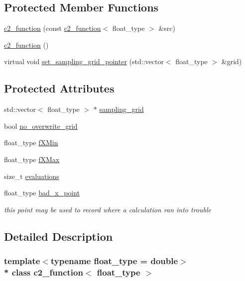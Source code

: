\subsection*{Protected Member Functions}
\begin{DoxyCompactItemize}
\item 
\hyperlink{classc2__function_a0dcc0aa8129ea37e46a72bcafd5d1dc3}{c2\+\_\+function} (const \hyperlink{classc2__function}{c2\+\_\+function}$<$ float\+\_\+type $>$ \&src)
\item 
\hyperlink{classc2__function_acc63ccad3b4a2151c641695003aa977f}{c2\+\_\+function} ()
\item 
virtual void \hyperlink{classc2__function_af06d3b95c044d5ece8343badec919d17}{set\+\_\+sampling\+\_\+grid\+\_\+pointer} (std\+::vector$<$ float\+\_\+type $>$ \&grid)
\end{DoxyCompactItemize}
\subsection*{Protected Attributes}
\begin{DoxyCompactItemize}
\item 
std\+::vector$<$ float\+\_\+type $>$ $\ast$ \hyperlink{classc2__function_ad9714faf2c3d053a77fd733b52834754}{sampling\+\_\+grid}
\item 
bool \hyperlink{classc2__function_a12085ddfc5716c442bb59c5672e140dd}{no\+\_\+overwrite\+\_\+grid}
\item 
float\+\_\+type \hyperlink{classc2__function_a72d60216e8a9c61039d4895c6a15b0ce}{f\+X\+Min}
\item 
float\+\_\+type \hyperlink{classc2__function_a8d000a2d3ca13a119f4bcf4e31a9bca6}{f\+X\+Max}
\item 
size\+\_\+t \hyperlink{classc2__function_a0737663eb36818cd357852479e6b96f2}{evaluations}
\item 
float\+\_\+type \hyperlink{classc2__function_a19b31dd52b778a2fe5f156def38e41d4}{bad\+\_\+x\+\_\+point}
\begin{DoxyCompactList}\small\item\em this point may be used to record where a calculation ran into trouble \end{DoxyCompactList}\end{DoxyCompactItemize}


\subsection{Detailed Description}
\subsubsection*{template$<$typename float\+\_\+type = double$>$\\*
class c2\+\_\+function$<$ float\+\_\+type $>$}

